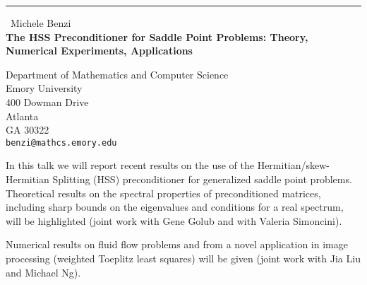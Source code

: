 \documentclass{report}
\begin{document}
\begin{center}
\rule{6in}{1pt} \
{\large Michele Benzi \\
{\bf The HSS Preconditioner for Saddle Point Problems: Theory, Numerical Experiments, Applications}}

Department of Mathematics and Computer Science \\ Emory University \\ 400 Dowman Drive \\ Atlanta \\ GA 30322
\\
{\tt benzi@mathcs.emory.edu}\end{center}

In this talk we will report recent results on the use of
the Hermitian/skew-Hermitian Splitting (HSS) preconditioner
for generalized saddle point problems. Theoretical results
on the spectral properties of preconditioned matrices, including
sharp bounds on the eigenvalues and conditions for a
real spectrum, will be highlighted (joint work with
Gene Golub and with Valeria Simoncini).

Numerical results on fluid flow problems and from a novel
application in image processing (weighted Toeplitz least squares)
will be given (joint work with Jia Liu and Michael Ng).
\end{document}
